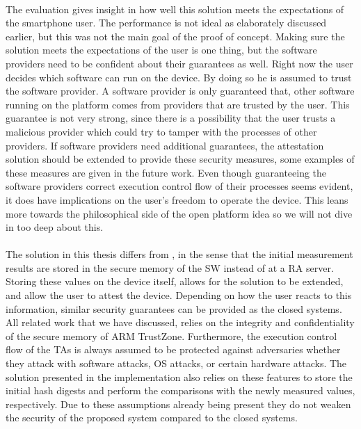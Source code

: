\paragraph*{}
The evaluation gives insight in how well this solution meets the expectations of the smartphone user. The performance is not ideal as elaborately discussed earlier, but this was not the main goal of the proof of concept. Making sure the solution meets the expectations of the user is one thing, but the software providers need to be confident about their guarantees as well. Right now the user decides which software can run on the device. By doing so he is assumed to trust the software provider. A software provider is only guaranteed that, other software running on the platform comes from providers that are trusted by the user. This guarantee is not very strong, since there is a possibility that the user trusts a malicious provider which could try to tamper with the processes of other providers. If software providers need additional guarantees, the attestation solution should be extended to provide these security measures, some examples of these measures are given in the future work. Even though guaranteeing the software providers correct execution control flow of their processes seems evident, it does have implications on the user's freedom to operate the device. This leans more towards the philosophical side of the open platform idea so we will not dive in too deep about this.

\paragraph*{}
The solution in this thesis differs from \cite{LingZhen2021Sbtb}, in the sense that the initial measurement results are stored in the secure memory of the SW instead of at a RA server. Storing these values on the device itself, allows for the solution to be extended, and allow the user to attest the device. Depending on how the user reacts to this information, similar security guarantees can be provided as the closed systems. All related work that we have discussed, relies on the integrity and confidentiality of the secure memory of ARM TrustZone. Furthermore, the execution control flow of the TAs is always assumed to be protected against adversaries whether they attack with software attacks, OS attacks, or certain hardware attacks. The solution presented in the implementation also relies on these features to store the initial hash digests and perform the comparisons with the newly measured values, respectively. Due to these assumptions already being present they do not weaken the security of the proposed system compared to the closed systems.

